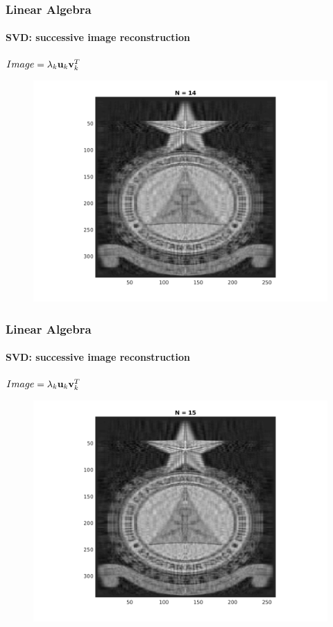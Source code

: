 \documentclass[hyperref={pdfpagelabels=true}]{beamer}
\begin{document}
\begin{frame}
\frametitle{Linear Algebra}
\framesubtitle{SVD: successive image reconstruction} 
\small{
\begin{center}
$Image = \lambda_k{\bf u}_k {\bf v}_k^T$
\end{center}}
\begin{figure}[!htb]
\centering
\includegraphics [scale=0.48]{n/b14.png}
\end{figure}
\end{frame}

\begin{frame}
\frametitle{Linear Algebra}
\framesubtitle{SVD: successive image reconstruction} 
\small{
\begin{center}
$Image = \lambda_k{\bf u}_k {\bf v}_k^T$
\end{center}}
\begin{figure}[!htb]
\centering
\includegraphics [scale=0.48]{n/b15.png}
\end{figure}
\end{frame}
\end{document}
